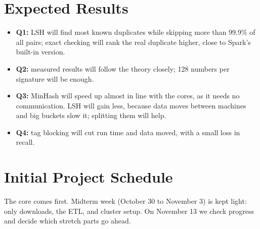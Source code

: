 \documentclass[11pt,a4paper]{article}
\begin{document}
\section{Expected Results}
\begin{itemize}
  \item \textbf{Q1:} LSH will find most known duplicates while skipping more
        than 99.9\% of all pairs; exact checking will rank the real duplicate
        higher, close to Spark's built-in version.
  \item \textbf{Q2:} measured results will follow the theory closely; 128
        numbers per signature will be enough.
  \item \textbf{Q3:} MinHash will speed up almost in line with the cores, as it
        needs no communication. LSH will gain less, because data moves between
        machines and big buckets slow it; splitting them will help.
  \item \textbf{Q4:} tag blocking will cut run time and data moved, with a
        small loss in recall.
\end{itemize}

\section{Initial Project Schedule}

The core comes first. Midterm week (October 30 to November 3) is kept light:
only downloads, the ETL, and cluster setup. On November 13 we check progress
and decide which stretch parts go ahead.
\end{document}
